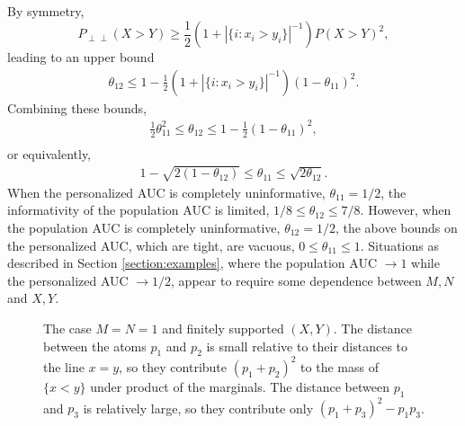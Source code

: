 \documentclass[12pt]{article}
\DeclareMathOperator{\AUC}{AUC}
\renewcommand{\P}{P}
\newcommand{\cind}{\perp \!\!\! \perp}
\newcommand{\aucindiv}{\theta_{11}}%
\newcommand{\aucpop}{\theta_{12}}%
\begin{document}
By symmetry,
$$
\P_{\cind}(X>Y) \ge \frac{1}{2}(1+|\{i:x_i>y_i\}|^{-1})\P(X>Y)^2,
$$
leading to an upper bound
\begin{align}
  \aucpop \le 1 - \frac{1}{2}(1+|\{i:x_i>y_i\}|^{-1})(1-\aucindiv)^2.
\end{align}
Combining these bounds,
\begin{align}
  \frac{1}{2}\aucindiv^2 \le \aucpop \le 1 - \frac{1}{2}(1-\aucindiv)^2,\\
\end{align}
or equivalently,
\begin{align}
  1-\sqrt{2(1-\aucpop)} \le \aucindiv \le \sqrt{2\aucpop}.
\end{align}
When the personalized AUC is completely uninformative, $\aucindiv=1/2$,
the informativity of the population AUC is limited,
$1/8 \le \aucpop \le 7/8$. However, when the population AUC is
completely uninformative, $\aucpop=1/2$, the above bounds on the personalized AUC, which are tight, are vacuous, $0\le\aucindiv\le 1$. Situations as described in Section \ref{section:examples}, where the population AUC $\to 1$ while the personalized AUC $\to 1/2$, appear to require some dependence between $M,N$ and $X,Y$. %



\begin{figure}[!tbp]
  \centering
  \caption{The case $M=N=1$ and finitely supported $(X,Y)$. The
    distance between the atoms $p_1$ and $p_2$ is small relative to
    their distances to the line $x=y$, so they contribute
    $(p_1+p_2)^2$ to the mass of $\{x<y\}$ under product of the
    marginals. The distance between $p_1$ and $p_3$ is relatively
    large, so they contribute only
    $(p_1+p_3)^2-p_1p_3$.}  \label{fig:inequality}
\end{figure}
\end{document}
